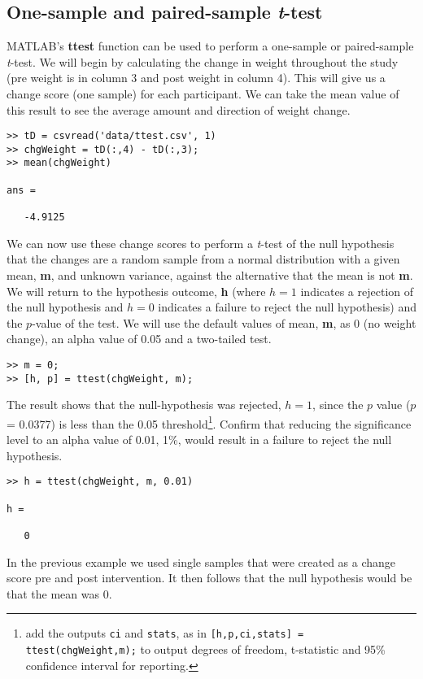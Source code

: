 \documentclass[12pt,a4paper]{article}
\begin{document}
\subsection{One-sample and paired-sample \emph{t}-test}
MATLAB's \textbf{ttest} function can be used to perform a one-sample or paired-sample \emph{t}-test.  
We will begin by calculating the change in weight throughout the study (pre weight is in column 3 and post weight in column 4).  
This will give us a change score (one sample) for each participant.  
We can take the mean value of this result to see the average amount and direction of weight change.
\begin{lstlisting}[style=Matlab-editor]
>> tD = csvread('data/ttest.csv', 1)
>> chgWeight = tD(:,4) - tD(:,3);
>> mean(chgWeight)

ans =

   -4.9125
\end{lstlisting}
We can now use these change scores to perform a \emph{t}-test of the null hypothesis that the changes are a random sample from a normal distribution with a given mean, \textbf{m}, and unknown variance, against the alternative that the mean is not \textbf{m}.  
We will return to the hypothesis outcome, \textbf{h} (where $h = 1$ indicates a rejection of the null hypothesis and $h = 0$ indicates a failure to reject the null hypothesis) and the $p$-value of the test.  
We will use the default values of mean, \textbf{m}, as 0 (no weight change), an alpha value of 0.05 and a two-tailed test.
\begin{lstlisting}[style=Matlab-editor]
>> m = 0;
>> [h, p] = ttest(chgWeight, m);
\end{lstlisting}
The result shows that the null-hypothesis was rejected, $h = 1$, since the $p$ value ($p$ = 0.0377) is less than the 0.05 threshold\footnote{add the outputs \texttt{ci} and \texttt{stats}, as in \texttt{[h,p,ci,stats] = ttest(chgWeight,m);} to output degrees of freedom, t-statistic and 95\% confidence interval for reporting.}.  
Confirm that reducing the significance level to an alpha value of 0.01, 1\%, would result in a failure to reject the null hypothesis.
\begin{lstlisting}[style=Matlab-editor]
>> h = ttest(chgWeight, m, 0.01)

h = 

   0
\end{lstlisting}
In the previous example we used single samples that were created as a change score pre and post intervention.  
It then follows that the null hypothesis would be that the mean was 0.  
\end{document}
